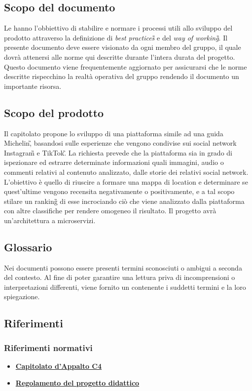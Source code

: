 \subsection{Scopo del documento}
Le \NdP{} hanno l'obbiettivo di stabilire e normare i processi utili allo sviluppo del prodotto attraverso la definizione di \emph{best practices\G{}} e del \emph{way of working\G{}}.
Il presente documento deve essere visionato da ogni membro del gruppo, il quale dovrà attenersi alle norme qui descritte durante l'intera durata del progetto.
Questo documento viene frequentemente aggiornato per assicurarsi che le norme descritte rispecchino la realtà operativa del gruppo rendendo il documento un importante risorsa.
\subsection{Scopo del prodotto}
Il capitolato propone lo sviluppo di una piattaforma simile ad una guida Michelin\G, basandosi sulle esperienze che vengono condivise sui social network Instagram\G{} e TikTok\G.
La richiesta prevede che la piattaforma sia in grado di ispezionare ed estrarre determinate informazioni quali immagini, audio o commenti relativi al contenuto analizzato, dalle storie dei relativi social network.
L'obiettivo è quello di riuscire a formare una mappa di location e determinare se quest'ultime vengono recensita negativamente o positivamente, e a tal scopo stilare un ranking\G{} di esse incrociando ciò che viene analizzato dalla piattaforma con altre classifiche per rendere omogeneo il risultato.
Il progetto avrà un'architettura a microservizi.
\subsection{Glossario}
Nei documenti possono essere presenti termini sconosciuti o ambigui a seconda del contesto. Al fine di poter garantire una lettura priva di incomprensioni o interpretazioni differenti, viene fornito un \Glo{} contenente i suddetti termini e la loro spiegazione. %
\subsection{Riferimenti}
\subsubsection{Riferimenti normativi}
\begin{itemize}
	\item
	\href{https://www.math.unipd.it/~tullio/IS-1/2021/Progetto/C4p.pdf}{\textbf{Capitolato d'Appalto C4}}
	\item
	\href{https://www.math.unipd.it/~tullio/IS-1/2021/Dispense/PD2.pdf}{\textbf{Regolamento del progetto didattico}}
\end{itemize}
